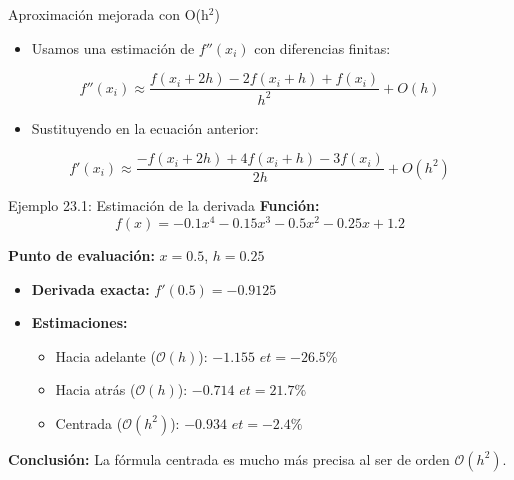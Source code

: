 \documentclass[main.tex]{subfiles}
\begin{document}
\begin{frame}{Aproximación mejorada con O(h$^2$)}
\begin{itemize}
  \item Usamos una estimación de $f''(x_i)$ con diferencias finitas:
\end{itemize}
\begin{equation*}
  f''(x_i) \approx \frac{f(x_i + 2h) - 2f(x_i + h) + f(x_i)}{h^2} + O(h)
\end{equation*}
\begin{itemize}
  \item Sustituyendo en la ecuación anterior:
\end{itemize}
\begin{equation*}
  f'(x_i) \approx \frac{-f(x_i + 2h) + 4f(x_i + h) - 3f(x_i)}{2h} + O(h^2)
\end{equation*}
\end{frame}
\begin{frame}{Ejemplo 23.1: Estimación de la derivada}
\textbf{Función:}
\[f(x) = -0.1x^4 - 0.15x^3 - 0.5x^2 - 0.25x + 1.2\]

\textbf{Punto de evaluación:} $x = 0.5$, $h = 0.25$

\begin{itemize}
  \item \textbf{Derivada exacta:} $f'(0.5) = -0.9125$
  \item \textbf{Estimaciones:}
  \begin{itemize}
    \item Hacia adelante ($\mathcal{O}(h)$): $-1.155$ \quad $et = -26.5\%$
    \item Hacia atrás ($\mathcal{O}(h)$): $-0.714$ \quad $et = 21.7\%$
    \item Centrada ($\mathcal{O}(h^2)$): $-0.934$ \quad $et = -2.4\%$
  \end{itemize}
\end{itemize}

\textbf{Conclusión:} La fórmula centrada es mucho más precisa al ser de orden $\mathcal{O}(h^2)$.
\end{frame}
\end{document}
